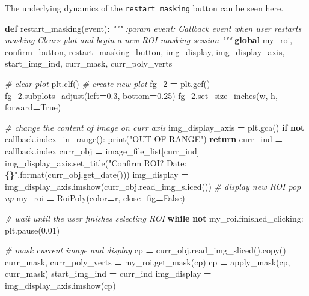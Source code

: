 \documentclass[
]{article}
\newenvironment{Shaded}{\begin{snugshade}}{\end{snugshade}}
\newcommand{\BuiltInTok}[1]{#1}
\newcommand{\CommentTok}[1]{\textcolor[rgb]{0.56,0.35,0.01}{\textit{#1}}}
\newcommand{\ControlFlowTok}[1]{\textcolor[rgb]{0.13,0.29,0.53}{\textbf{#1}}}
\newcommand{\FloatTok}[1]{\textcolor[rgb]{0.00,0.00,0.81}{#1}}
\newcommand{\KeywordTok}[1]{\textcolor[rgb]{0.13,0.29,0.53}{\textbf{#1}}}
\newcommand{\NormalTok}[1]{#1}
\newcommand{\OperatorTok}[1]{\textcolor[rgb]{0.81,0.36,0.00}{\textbf{#1}}}
\newcommand{\SpecialCharTok}[1]{\textcolor[rgb]{0.81,0.36,0.00}{\textbf{#1}}}
\newcommand{\StringTok}[1]{\textcolor[rgb]{0.31,0.60,0.02}{#1}}
\newcommand{\VariableTok}[1]{\textcolor[rgb]{0.00,0.00,0.00}{#1}}
\begin{document}
The underlying dynamics of the \texttt{restart\_masking} button can be seen here.

\begin{Shaded}
\begin{Highlighting}[]
\KeywordTok{def}\NormalTok{ restart\_masking(event):}
    \CommentTok{"""}
\CommentTok{    :param event: Callback event when user restarts masking}
\CommentTok{    Clears plot and begin a new ROI masking session}
\CommentTok{    """}
    \KeywordTok{global}\NormalTok{ my\_roi, confirm\_button, restart\_masking\_button, img\_display, img\_display\_axis, start\_img\_ind, curr\_mask, curr\_poly\_verts}

    \CommentTok{\# clear plot}
\NormalTok{    plt.clf()}
    \CommentTok{\# create new plot}
\NormalTok{    fg\_2 }\OperatorTok{=}\NormalTok{ plt.gcf()}
\NormalTok{    fg\_2.subplots\_adjust(left}\OperatorTok{=}\FloatTok{0.3}\NormalTok{, bottom}\OperatorTok{=}\FloatTok{0.25}\NormalTok{)}
\NormalTok{    fg\_2.set\_size\_inches(w, h, forward}\OperatorTok{=}\VariableTok{True}\NormalTok{)}

    \CommentTok{\# change the content of image on curr axis}
\NormalTok{    img\_display\_axis }\OperatorTok{=}\NormalTok{ plt.gca()}
    \ControlFlowTok{if} \KeywordTok{not}\NormalTok{ callback.index\_in\_range():}
        \BuiltInTok{print}\NormalTok{(}\StringTok{"OUT OF RANGE"}\NormalTok{)}
        \ControlFlowTok{return}
\NormalTok{    curr\_ind }\OperatorTok{=}\NormalTok{ callback.index}
\NormalTok{    curr\_obj }\OperatorTok{=}\NormalTok{ image\_file\_list[curr\_ind]}
\NormalTok{    img\_display\_axis.set\_title(}\StringTok{"Confirm ROI? Date: }\SpecialCharTok{\{\}}\StringTok{"}\NormalTok{.}\BuiltInTok{format}\NormalTok{(curr\_obj.get\_date()))}
\NormalTok{    img\_display }\OperatorTok{=}\NormalTok{ img\_display\_axis.imshow(curr\_obj.read\_img\_sliced())}
    \CommentTok{\# display new ROI pop up}
\NormalTok{    my\_roi }\OperatorTok{=}\NormalTok{ RoiPoly(color}\OperatorTok{=}\StringTok{\textquotesingle{}r\textquotesingle{}}\NormalTok{, close\_fig}\OperatorTok{=}\VariableTok{False}\NormalTok{)}

    \CommentTok{\# wait until the user finishes selecting ROI}
    \ControlFlowTok{while} \KeywordTok{not}\NormalTok{ my\_roi.finished\_clicking:}
\NormalTok{        plt.pause(}\FloatTok{0.01}\NormalTok{)}

    \CommentTok{\# mask current image and display}
\NormalTok{    cp }\OperatorTok{=}\NormalTok{ curr\_obj.read\_img\_sliced().copy()}
\NormalTok{    curr\_mask, curr\_poly\_verts }\OperatorTok{=}\NormalTok{ my\_roi.get\_mask(cp)}
\NormalTok{    cp }\OperatorTok{=}\NormalTok{ apply\_mask(cp, curr\_mask)}
\NormalTok{    start\_img\_ind }\OperatorTok{=}\NormalTok{ curr\_ind}
\NormalTok{    img\_display }\OperatorTok{=}\NormalTok{ img\_display\_axis.imshow(cp)}


\end{Highlighting}
\end{Shaded}
\end{document}
